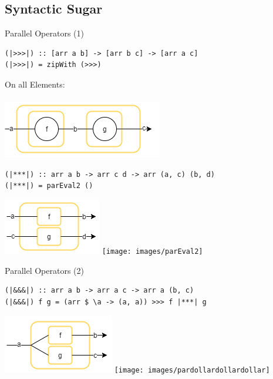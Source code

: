 \subsection{Syntactic Sugar}
\begin{frame}[fragile]{Parallel Operators (1)}
\begin{lstlisting}[frame=htrbl]
(|>>>|) :: [arr a b] -> [arr b c] -> [arr a c]
(|>>>|) = zipWith (>>>)
\end{lstlisting}
\begin{center}
On all Elements:\\~\\
\includegraphics[scale=0.5]{images/compose}
\end{center}

\begin{lstlisting}[frame=htrbl]
(|***|) :: arr a b -> arr c d -> arr (a, c) (b, d)
(|***|) = parEval2 ()
\end{lstlisting}
\begin{center}
\includegraphics[scale=0.5]{images/starstarstar}
\hspace{2em}
\texttt{[image: images/parEval2]}
\end{center}
\end{frame}

\begin{frame}[fragile]{Parallel Operators (2)}
\begin{lstlisting}[frame=htrbl]
(|&&&|) :: arr a b -> arr a c -> arr a (b, c)
(|&&&|) f g = (arr $ \a -> (a, a)) >>> f |***| g
\end{lstlisting}
\begin{center}
\includegraphics[scale=0.5]{images/dollardollardollar}
\hspace{2em}
\texttt{[image: images/pardollardollardollar]}
\end{center}
\end{frame}

